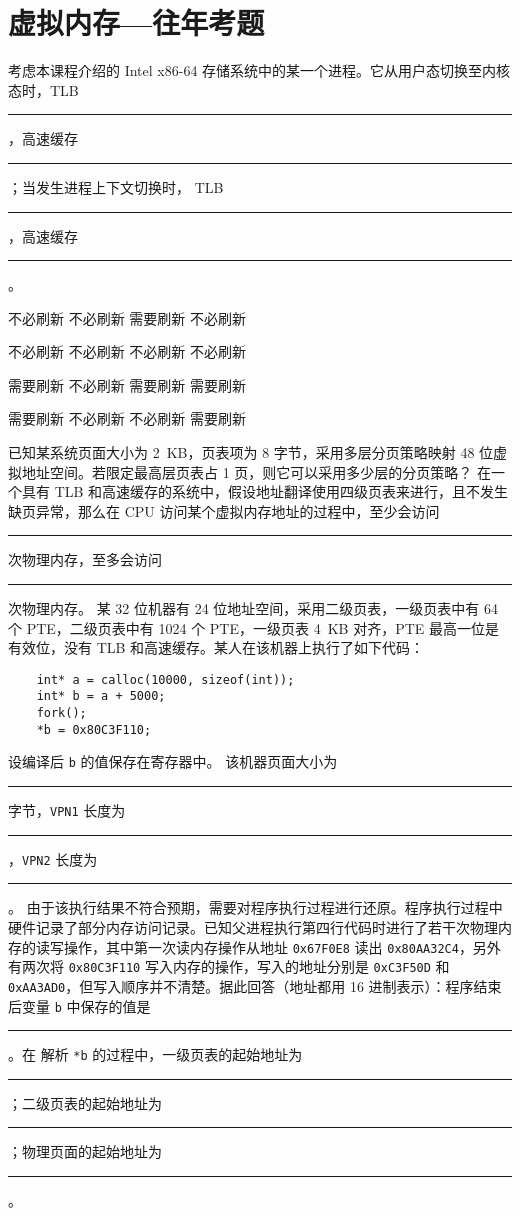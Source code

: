 \chapter{虚拟内存{---}往年考题}\thispagestyle{empty}
    \begin{problems}
         考虑本课程介绍的 Intel x86-64 存储系统中的某一个进程。它从用户态切换至内核态时，TLB \rule{2.5cm}{0.25mm}，高速缓存 \rule{2.5cm}{0.25mm}；当发生进程上下文切换时， TLB \rule{2.5cm}{0.25mm}，高速缓存 \rule{2.5cm}{0.25mm}。
        \begin{choices}
            \item 不必刷新 \quad 不必刷新 \quad 需要刷新 \quad 不必刷新
            \item 不必刷新 \quad 不必刷新 \quad 不必刷新 \quad 不必刷新
            \item 需要刷新 \quad 不必刷新 \quad 需要刷新 \quad 需要刷新
            \item 需要刷新 \quad 不必刷新 \quad 不必刷新 \quad 需要刷新
        \end{choices}
         已知某系统页面大小为 \SI{2}{KB}，页表项为 8 字节，采用多层分页策略映射 48 位虚拟地址空间。若限定最高层页表占 1 页，则它可以采用多少层的分页策略？
         在一个具有 TLB 和高速缓存的系统中，假设地址翻译使用四级页表来进行，且不发生缺页异常，那么在 CPU 访问某个虚拟内存地址的过程中，至少会访问 \rule{2.5cm}{0.25mm} 次物理内存，至多会访问 \rule{2.5cm}{0.25mm} 次物理内存。
         某 32 位机器有 24 位地址空间，采用二级页表，一级页表中有 64 个 PTE，二级页表中有 1024 个 PTE，一级页表 \SI{4}{KB} 对齐，PTE 最高一位是有效位，没有 TLB 和高速缓存。某人在该机器上执行了如下代码：
        \begin{verbatim}
    int* a = calloc(10000, sizeof(int));
    int* b = a + 5000;
    fork();
    *b = 0x80C3F110;
        \end{verbatim}
        设编译后 \verb|b| 的值保存在寄存器中。
        \qn 该机器页面大小为 \rule{2.5cm}{0.25mm} 字节，\verb|VPN1| 长度为 \rule{2.5cm}{0.25mm}，\verb|VPN2| 长度为 \rule{2.5cm}{0.25mm}。
        \qn 由于该执行结果不符合预期，需要对程序执行过程进行还原。程序执行过程中硬件记录了部分内存访问记录。已知父进程执行第四行代码时进行了若干次物理内存的读写操作，其中第一次读内存操作从地址 \verb|0x67F0E8| 读出 \verb|0x80AA32C4|，另外有两次将 \verb|0x80C3F110| 写入内存的操作，写入的地址分别是 \verb|0xC3F50D| 和 \verb|0xAA3AD0|，但写入顺序并不清楚。据此回答（地址都用 16 进制表示）：程序结束后变量 \verb|b| 中保存的值是\rule{2.5cm}{0.25mm}。在 解析 \verb|*b| 的过程中，一级页表的起始地址为 \rule{2.5cm}{0.25mm}；二级页表的起始地址为 \rule{2.5cm}{0.25mm}；物理页面的起始地址为 \rule{2.5cm}{0.25mm}。

\end{problems}
